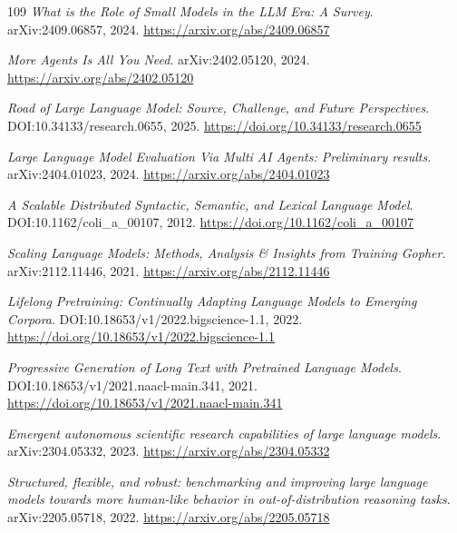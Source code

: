 \documentclass[11pt,a4paper]{article}
\begin{document}
\begin{thebibliography}{109}
\newblock \emph{What is the Role of Small Models in the LLM Era: A Survey}.
\newblock arXiv:2409.06857, 2024.
\newblock \url{https://arxiv.org/abs/2409.06857}

\newblock \emph{More Agents Is All You Need}.
\newblock arXiv:2402.05120, 2024.
\newblock \url{https://arxiv.org/abs/2402.05120}

\newblock \emph{Road of Large Language Model: Source, Challenge, and Future Perspectives}.
\newblock DOI:10.34133/research.0655, 2025.
\newblock \url{https://doi.org/10.34133/research.0655}

\newblock \emph{Large Language Model Evaluation Via Multi AI Agents: Preliminary results}.
\newblock arXiv:2404.01023, 2024.
\newblock \url{https://arxiv.org/abs/2404.01023}

\newblock \emph{A Scalable Distributed Syntactic, Semantic, and Lexical Language Model}.
\newblock DOI:10.1162/coli\_a\_00107, 2012.
\newblock \url{https://doi.org/10.1162/coli_a_00107}

\newblock \emph{Scaling Language Models: Methods, Analysis \& Insights from Training Gopher}.
\newblock arXiv:2112.11446, 2021.
\newblock \url{https://arxiv.org/abs/2112.11446}

\newblock \emph{Lifelong Pretraining: Continually Adapting Language Models to Emerging Corpora}.
\newblock DOI:10.18653/v1/2022.bigscience-1.1, 2022.
\newblock \url{https://doi.org/10.18653/v1/2022.bigscience-1.1}

\newblock \emph{Progressive Generation of Long Text with Pretrained Language Models}.
\newblock DOI:10.18653/v1/2021.naacl-main.341, 2021.
\newblock \url{https://doi.org/10.18653/v1/2021.naacl-main.341}

\newblock \emph{Emergent autonomous scientific research capabilities of large language models}.
\newblock arXiv:2304.05332, 2023.
\newblock \url{https://arxiv.org/abs/2304.05332}

\newblock \emph{Structured, flexible, and robust: benchmarking and improving large language models towards more human-like behavior in out-of-distribution reasoning tasks}.
\newblock arXiv:2205.05718, 2022.
\newblock \url{https://arxiv.org/abs/2205.05718}


\end{thebibliography}
\end{document}
